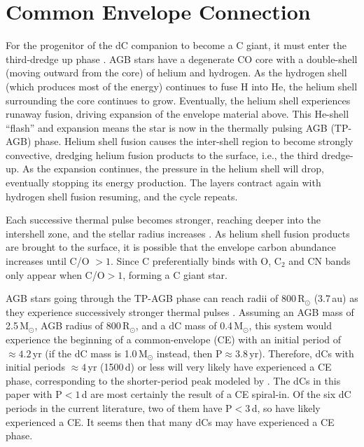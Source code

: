 \documentclass[twocolumn]{aastex631}
\begin{document}
\section{Common Envelope Connection}\label{sec:BPS}

For the progenitor of the dC companion to become a C giant, it must enter the third-dredge up phase \citep{Iben1974}. AGB stars have a degenerate CO core with a double-shell (moving outward from the core) of helium and hydrogen. As the hydrogen shell (which produces most of the energy) continues to fuse H into He, the helium shell surrounding the core continues to grow. Eventually, the helium shell experiences runaway fusion, driving expansion of the envelope material above. This He-shell ``flash'' and expansion means the star is now in the thermally pulsing AGB (TP-AGB) phase. Helium shell fusion causes the inter-shell region to become strongly convective, dredging helium fusion products to the surface, i.e., the third dredge-up. As the expansion continues, the pressure in the helium shell will drop, eventually stopping its energy production. The layers contract again with hydrogen shell fusion resuming, and the cycle repeats. 

Each successive thermal pulse becomes stronger, reaching deeper into the intershell zone, and the stellar radius increases \citep{Iben1983}. As helium shell fusion products are brought to the surface, it is possible that the envelope carbon abundance increases until C/O $> 1$. Since C preferentially binds with O, C$_2$ and CN bands only appear when C/O$> 1$, forming a C giant star. 

AGB stars going through the TP-AGB phase can reach radii of 800\,R$_\odot$ (3.7\,au) as they experience successively stronger thermal pulses \citep{Marigo2017}. Assuming an AGB mass of 2.5\,M$_\odot$, AGB radius of 800\,R$_\odot$, and a dC mass of 0.4\,M$_\odot$, this system would experience the beginning of a common-envelope (CE) with an initial period of $\approx 4.2$\,yr (if the dC mass is 1.0\,M$_\odot$ instead, then P$\approx 3.8$\,yr). Therefore, dCs with initial periods $\approx 4$\,yr (1500\,d) or less will very likely have experienced a CE phase, corresponding to the shorter-period peak modeled by \citet{Kool1995}. The dCs in this paper with P$< 1$\,d are most certainly the result of a CE spiral-in. Of the six dC periods in the current literature, two of them have P$< 3$\,d, so have likely experienced a CE. It seems then that many dCs may have experienced a CE phase.
\end{document}

